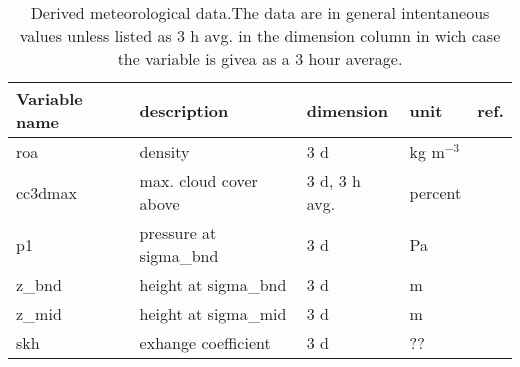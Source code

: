 \begin{table} [h]
\begin{center}
\caption{Derived meteorological data.The data are in general intentaneous 
values unless listed as 3 h avg. in the dimension column in wich case the 
variable is givea as a 3 hour average.}
\label {table:variable_derivmet}
\begin{tabular} {l|l|l|l|l}
Variable name & description             &dimension& unit       & ref.   \\
\hline
roa           & density                 & 3 d     & kg m$^{-3}$&        \\
cc3dmax       & max. cloud cover above  & 3 d, 3 h avg. & percent  &      \\
p1            & pressure at sigma\_bnd   & 3 d     & Pa         &        \\
z\_bnd         & height at sigma\_bnd     & 3 d     & m          &        \\
z\_mid         & height at sigma\_mid     & 3 d     & m          &        \\
skh           & exhange coefficient     & 3 d     & ??         &        \\
\end {tabular}
\end {center}
\end {table}

